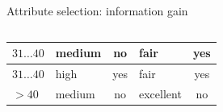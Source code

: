 \documentclass[aspectratio=169,t,table]{beamer}
\begin{document}
{\begin{frame}{Attribute selection: information gain}
\begin{columns}
\begin{column}{0.45\textwidth}
{\begin{tabular}{|l|l|c|l|c|}
            \cellcolor{yellow!20}$31\ldots40$ & \cellcolor{yellow!20}medium & \cellcolor{yellow!20}no & \cellcolor{yellow!20}fair & \cellcolor{green!20}yes \\\hline
            \cellcolor{yellow!20}$31\ldots40$ & \cellcolor{yellow!20}high & \cellcolor{yellow!20}yes & \cellcolor{yellow!20}fair & \cellcolor{green!20}yes \\\hline
            \cellcolor{yellow!20}$>40$ & \cellcolor{yellow!20}medium & \cellcolor{yellow!20}no & \cellcolor{yellow!20}excellent & \cellcolor{red!20}no \\\hline
          \end{tabular}}
        \end{column}
      \end{columns}
    \end{frame}
  }
\end{document}
